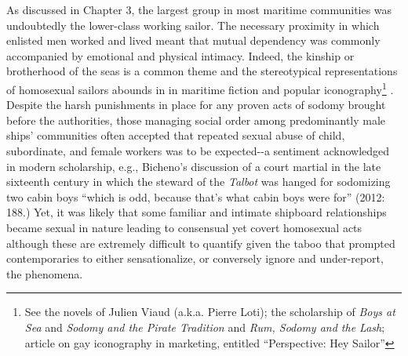   As discussed in Chapter 3, the largest group in most maritime communities was undoubtedly the lower-class working sailor. The necessary proximity in which enlisted men worked and lived meant that mutual dependency was commonly accompanied by emotional and physical intimacy. Indeed, the kinship or brotherhood of the seas is a common theme and the stereotypical representations of homosexual sailors abounds in in maritime fiction and popular iconography\footnote{See the novels of Julien Viaud (a.k.a. Pierre Loti); the scholarship of  \textit{Boys at Sea} and  \textit{Sodomy and the Pirate Tradition} and  \textit{Rum, Sodomy and the Lash};  article on gay iconography in marketing, entitled “Perspective: Hey Sailor”} . Despite the harsh punishments in place for any proven acts of sodomy brought before the authorities, those managing social order among predominantly male ships’ communities often accepted that repeated sexual abuse of child, subordinate, and female workers was to be expected-{}-a sentiment acknowledged in modern scholarship, e.g., Bicheno’s discussion of a court martial in the late sixteenth century in which the steward of the \textit{Talbot} was hanged for sodomizing two cabin boys “which is odd, because that’s what cabin boys were for” (2012: 188.) Yet, it was likely that some familiar and intimate shipboard relationships became sexual in nature leading to consensual yet covert homosexual acts although these are extremely difficult to quantify given the taboo that prompted contemporaries to either sensationalize, or conversely ignore and under-report, the phenomena. 

